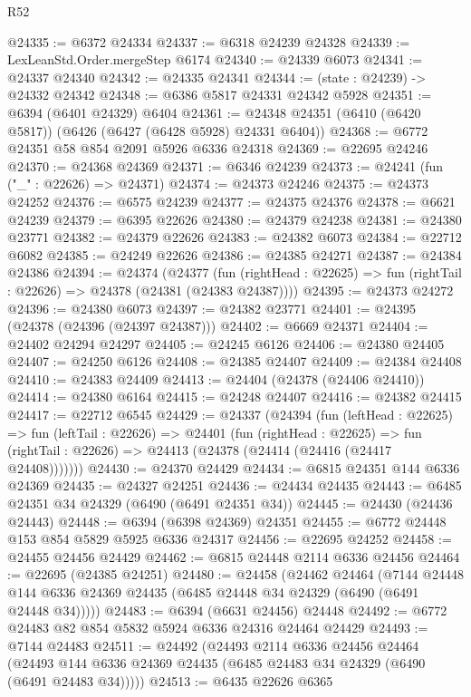\begin{lexlean}{R52}
\begin{coremodule}
@24335 := @6372 @24334
@24337 := @6318 @24239 @24328
@24339 := LexLeanStd.Order.mergeStep @6174
@24340 := @24339 @6073
@24341 := @24337 @24340
@24342 := @24335 @24341
@24344 := (state : @24239) -> @24332 @24342
@24348 := @6386 @5817 @24331 @24342 @5928
@24351 := @6394 (@6401 @24329) @6404
@24361 := @24348 @24351 (@6410 (@6420 @5817)) (@6426 (@6427 (@6428 @5928) @24331 @6404))
@24368 := @6772 @24351 @58 @854 @2091 @5926 @6336 @24318
@24369 := @22695 @24246
@24370 := @24368 @24369
@24371 := @6346 @24239
@24373 := @24241 (fun ("_" : @22626) => @24371)
@24374 := @24373 @24246
@24375 := @24373 @24252
@24376 := @6575 @24239
@24377 := @24375 @24376
@24378 := @6621 @24239
@24379 := @6395 @22626
@24380 := @24379 @24238
@24381 := @24380 @23771
@24382 := @24379 @22626
@24383 := @24382 @6073
@24384 := @22712 @6082
@24385 := @24249 @22626
@24386 := @24385 @24271
@24387 := @24384 @24386
@24394 := @24374
    (@24377
      (fun (rightHead : @22625) => fun (rightTail : @22626) => @24378 (@24381 (@24383 @24387))))
@24395 := @24373 @24272
@24396 := @24380 @6073
@24397 := @24382 @23771
@24401 := @24395 (@24378 (@24396 (@24397 @24387)))
@24402 := @6669 @24371
@24404 := @24402 @24294 @24297
@24405 := @24245 @6126
@24406 := @24380 @24405
@24407 := @24250 @6126
@24408 := @24385 @24407
@24409 := @24384 @24408
@24410 := @24383 @24409
@24413 := @24404 (@24378 (@24406 @24410))
@24414 := @24380 @6164
@24415 := @24248 @24407
@24416 := @24382 @24415
@24417 := @22712 @6545
@24429 := @24337
    (@24394
      (fun (leftHead : @22625) =>
      fun (leftTail : @22626) =>
      @24401
        (fun (rightHead : @22625) =>
        fun (rightTail : @22626) => @24413 (@24378 (@24414 (@24416 (@24417 @24408)))))))
@24430 := @24370 @24429
@24434 := @6815 @24351 @144 @6336 @24369
@24435 := @24327 @24251
@24436 := @24434 @24435
@24443 := @6485 @24351 @34 @24329 (@6490 (@6491 @24351 @34))
@24445 := @24430 (@24436 @24443)
@24448 := @6394 (@6398 @24369) @24351
@24455 := @6772 @24448 @153 @854 @5829 @5925 @6336 @24317
@24456 := @22695 @24252
@24458 := @24455 @24456 @24429
@24462 := @6815 @24448 @2114 @6336 @24456
@24464 := @22695 (@24385 @24251)
@24480 := @24458
    (@24462
      @24464
      (@7144 @24448 @144 @6336 @24369 @24435 (@6485 @24448 @34 @24329 (@6490 (@6491 @24448 @34)))))
@24483 := @6394 (@6631 @24456) @24448
@24492 := @6772 @24483 @82 @854 @5832 @5924 @6336 @24316 @24464 @24429
@24493 := @7144 @24483
@24511 := @24492
    (@24493
      @2114
      @6336
      @24456
      @24464
      (@24493 @144 @6336 @24369 @24435 (@6485 @24483 @34 @24329 (@6490 (@6491 @24483 @34)))))
@24513 := @6435 @22626 @6365

\end{coremodule}
\end{lexlean}
